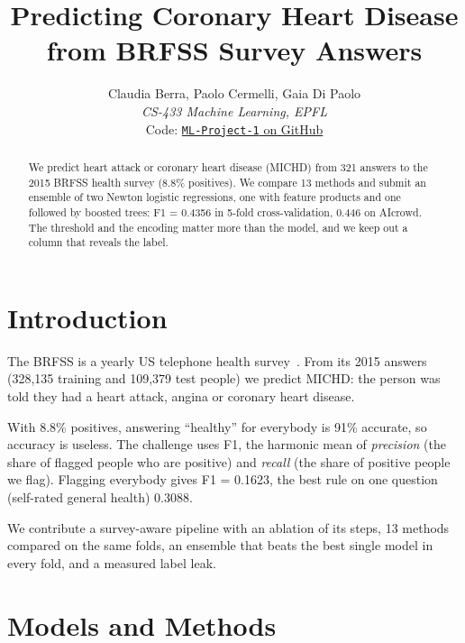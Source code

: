 \documentclass[10pt,conference,compsocconf]{IEEEtran}
\begin{document}
\title{Predicting Coronary Heart Disease\\from BRFSS Survey Answers}

\author{
  Claudia Berra, Paolo Cermelli, Gaia Di Paolo\\
  \textit{CS-433 Machine Learning, EPFL}\\
  Code: \href{https://github.com/gaiadp/ML-Project-1}{\texttt{ML-Project-1} on GitHub}
}

\maketitle

\begin{abstract}
We predict heart attack or coronary heart disease (MICHD) from 321 answers to the
2015 BRFSS health survey (8.8\% positives). We compare 13 methods and submit an
ensemble of two Newton logistic regressions, one with feature products and one
followed by boosted trees: F1 = 0.4356 in 5-fold cross-validation, 0.446 on AIcrowd.
The threshold and the encoding matter more than the model, and we keep out a column
that reveals the label.
\end{abstract}

\section{Introduction}
\label{sec:introduction}

The BRFSS is a yearly US telephone health survey~\cite{brfss2015}. From its 2015
answers (328,135 training and 109,379 test people) we predict MICHD: the person was told they had a heart attack, angina or
coronary heart disease.

With 8.8\% positives, answering ``healthy'' for everybody is 91\% accurate, so
accuracy is useless. The challenge uses F1, the harmonic mean of
\emph{precision} (the share of flagged people who are positive) and \emph{recall}
(the share of positive people we flag). Flagging everybody gives F1 = 0.1623, the
best rule on one question (self-rated general health) 0.3088.

We contribute a survey-aware pipeline with an ablation of its steps, 13 methods
compared on the same folds, an ensemble that beats the best single model in every
fold, and a measured label leak.

\section{Models and Methods}
\label{sec:methods}
\end{document}
